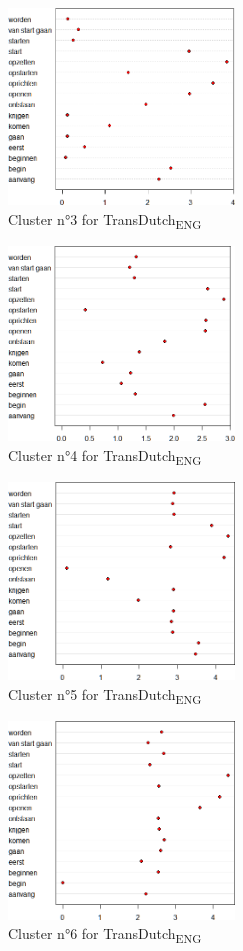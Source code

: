 \begin{figure}
\includegraphics[width=6cm]{figures/Vandevoorde2-img71.png}
\caption{\label{fig:4:69}Cluster n°3 for TransDutch\textsubscript{ENG}}
\end{figure}

\begin{figure}
\includegraphics[width=6cm]{figures/Vandevoorde2-img72.png}
\caption{\label{fig:4:70}Cluster n°4 for TransDutch\textsubscript{ENG}}
\end{figure}

\begin{figure}
\includegraphics[width=6cm]{figures/Vandevoorde2-img73.png}
\caption{\label{fig:4:71}Cluster n°5 for TransDutch\textsubscript{ENG}}
\end{figure}

\begin{figure}
\includegraphics[width=6cm]{figures/Vandevoorde2-img74.png}
\caption{\label{fig:4:72}Cluster n°6 for TransDutch\textsubscript{ENG}}
\end{figure}

